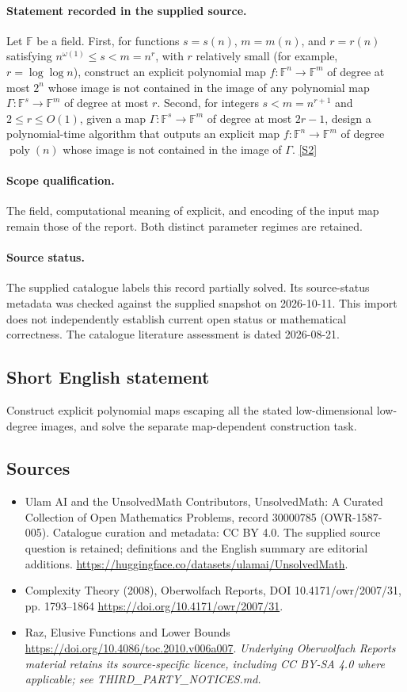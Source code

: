 \documentclass[11pt]{article}
\begin{document}
\paragraph{Statement recorded in the supplied source.}
Let $\mathbb{F}$ be a field. First, for functions $s=s(n)$, $m=m(n)$, and $r=r(n)$ satisfying $n^{\omega(1)}\leq s<m=n^r$, with $r$ relatively small (for example, $r=\log\log n$), construct an explicit polynomial map $f:\mathbb{F}^n\to\mathbb{F}^m$ of degree at most $2^n$ whose image is not contained in the image of any polynomial map $\Gamma:\mathbb{F}^s\to\mathbb{F}^m$ of degree at most $r$. Second, for integers $s<m=n^{r+1}$ and $2\leq r\leq O(1)$, given a map $\Gamma:\mathbb{F}^s\to\mathbb{F}^m$ of degree at most $2r-1$, design a polynomial-time algorithm that outputs an explicit map $f:\mathbb{F}^n\to\mathbb{F}^m$ of degree $\operatorname{poly}(n)$ whose image is not contained in the image of $\Gamma$. \href{https://doi.org/10.4171/owr/2007/31}{[S2]}
\paragraph{Scope qualification.}
The field, computational meaning of explicit, and encoding of the input map remain those of the report. Both distinct parameter regimes are retained.
\paragraph{Source status.}
The supplied catalogue labels this record partially solved. Its source-status metadata was checked against the supplied snapshot on 2026-10-11. This import does not independently establish current open status or mathematical correctness. The catalogue literature assessment is dated 2026-08-21.
\subsection{Short English statement}
Construct explicit polynomial maps escaping all the stated low-dimensional low-degree images, and solve the separate map-dependent construction task.
\subsection{Sources}
\begin{itemize}
\item[S1] Ulam AI and the UnsolvedMath Contributors, UnsolvedMath: A Curated Collection of Open Mathematics Problems, record 30000785 (OWR-1587-005). Catalogue curation and metadata: CC BY 4.0. The supplied source question is retained; definitions and the English summary are editorial additions.
\url{https://huggingface.co/datasets/ulamai/UnsolvedMath}.
\item[S2] Complexity Theory (2008), Oberwolfach Reports, DOI 10.4171/owr/2007/31, pp. 1793--1864
\url{https://doi.org/10.4171/owr/2007/31}.
\item[S3] Raz, Elusive Functions and Lower Bounds
\url{https://doi.org/10.4086/toc.2010.v006a007}.
\textit{Underlying Oberwolfach Reports material retains its source-specific licence, including CC BY-SA 4.0 where applicable; see THIRD\_PARTY\_NOTICES.md.}
\end{itemize}
\end{document}
